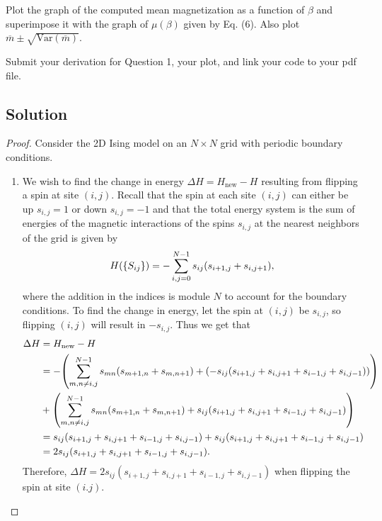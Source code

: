 \documentclass[12pt]{report}
\newenvironment{problem}{}{\newpage}
\begin{document}
\begin{problem}
\begin{enumerate}
    Plot the graph of the computed mean magnetization as a function of \(\beta\) and superimpose it with the graph of \(\mu(\beta)\) given by Eq. (6). Also plot \(\overline{m} \pm \sqrt{\text{Var}(\overline{m})}\).

    Submit your derivation for Question 1, your plot, and link your code to your pdf file.
\end{enumerate}


\subsection*{Solution}
\begin{proof}
    Consider the 2D Ising model on an $N\times N$ grid with periodic boundary conditions.
\begin{enumerate}
    \item  We wish to find the change in energy $\Delta H = H_{\text{new}} - H$ resulting from flipping a spin at site $(i,j)$. Recall that the spin at each site $(i,j)$ can either be up $s_{i,j} = 1$ or down $s_{i,j} = -1$ and that the total energy system is the sum of energies of the magnetic interactions of the spins $s_{i,j}$ at the nearest neighbors of the grid is given by
    \begin{equation*}
        H{\left({\left\{S_{ij}\right\}}\right)} = -\sum_{i,j = 0}^{N -1}s_{ij}(s_{i +1,j} + s_{i,j+1}),
    \end{equation*}
    where the addition in the indices is module $N$ to account for the boundary conditions. To find the change in energy, let the spin at $(i,j)$ be $s_{i,j}$, so flipping $(i,j)$ will result in $-s_{i,j}$. Thus we get that
    \begin{align*}
        \Delta H &= H_\text{new} - H\\
                &= -{\left(\sum_{m,n \neq i,j}^{N -1}s_{mn}(s_{m +1,n} + s_{m,n+1}) + {\left(-s_{ij}(s_{i+1,j} + s_{i,j+1} + s_{i-1,j} + s_{i,j-1})\right)}\right)}\\
                &+ {\left(\sum_{m,n \neq i,j}^{N -1}s_{mn}(s_{m +1,n} + s_{m,n+1}) + s_{ij}(s_{i+1,j} + s_{i,j+1} + s_{i-1,j} + s_{i,j-1})\right)}\\
                &= s_{ij}(s_{i+1,j} + s_{i,j+1} + s_{i-1,j} + s_{i,j-1}) + s_{ij}(s_{i+1,j} + s_{i,j+1} + s_{i-1,j} + s_{i,j-1})\\
                &=2s_{ij}(s_{i+1,j} + s_{i,j+1} + s_{i-1,j} + s_{i,j-1}).
    \end{align*}
    Therefore,  $\Delta H = 2s_{ij}(s_{i+1,j} + s_{i,j+1} + s_{i-1,j} + s_{i,j-1})$ when flipping the spin at site $(i.j)$.



\end{enumerate}
\end{proof}
\end{problem}
\end{document}
